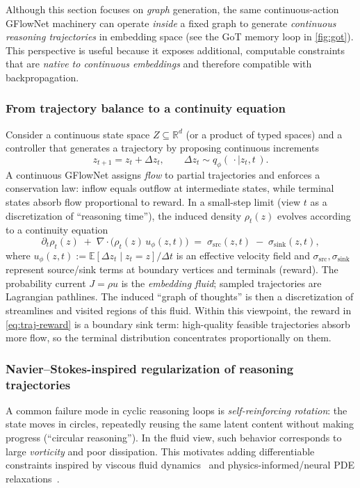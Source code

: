 \documentclass[11pt]{article}
\theoremstyle{definition}
\theoremstyle{plain}
\theoremstyle{remark}
\newcommand{\R}{\mathbb{R}}
\newcommand{\E}{\mathbb{E}}
\begin{document}
Although this section focuses on \emph{graph} generation, the same continuous-action GFlowNet machinery can operate \emph{inside} a fixed graph to generate \emph{continuous reasoning trajectories} in embedding space (see the GoT memory loop in \cref{fig:got}).
This perspective is useful because it exposes additional, computable constraints that are \emph{native to continuous embeddings} and therefore compatible with backpropagation.

\subsubsection{From trajectory balance to a continuity equation}
Consider a continuous state space $Z\subseteq\R^{d}$ (or a product of typed spaces) and a controller that generates a trajectory by proposing continuous increments
\[
z_{t+1}=z_t+\Delta z_t,
\qquad
\Delta z_t\sim q_\phi(\,\cdot \mid z_t,t\,).
\]
A continuous GFlowNet assigns \emph{flow} to partial trajectories and enforces a conservation law: inflow equals outflow at intermediate states, while terminal states absorb flow proportional to reward.
In a small-step limit (view $t$ as a discretization of ``reasoning time''), the induced density $\rho_t(z)$ evolves according to a continuity equation
\[
\partial_t \rho_t(z) \;+\; \nabla\!\cdot\!\bigl(\rho_t(z)\,u_\phi(z,t)\bigr)
\;=\; \sigma_{\mathrm{src}}(z,t)\;-\;\sigma_{\mathrm{sink}}(z,t),
\]
where $u_\phi(z,t):=\E[\Delta z_t\mid z_t=z]/\Delta t$ is an effective velocity field and $\sigma_{\mathrm{src}},\sigma_{\mathrm{sink}}$ represent source/sink terms at boundary vertices and terminals (reward).
The probability current $J=\rho u$ is the \emph{embedding fluid}; sampled trajectories are Lagrangian pathlines.
The induced ``graph of thoughts'' is then a discretization of streamlines and visited regions of this fluid.
Within this viewpoint, the reward in \eqref{eq:traj-reward} is a boundary sink term:
high-quality feasible trajectories absorb more flow, so the terminal distribution concentrates proportionally on them.

\subsubsection{Navier--Stokes-inspired regularization of reasoning trajectories}
A common failure mode in cyclic reasoning loops is \emph{self-reinforcing rotation}: the state moves in circles, repeatedly reusing the same latent content without making progress (``circular reasoning'').
In the fluid view, such behavior corresponds to large \emph{vorticity} and poor dissipation.
This motivates adding differentiable constraints inspired by viscous fluid dynamics~\cite{TemamNS} and physics-informed/neural PDE relaxations~\cite{RaissiPINNs}.
\end{document}
